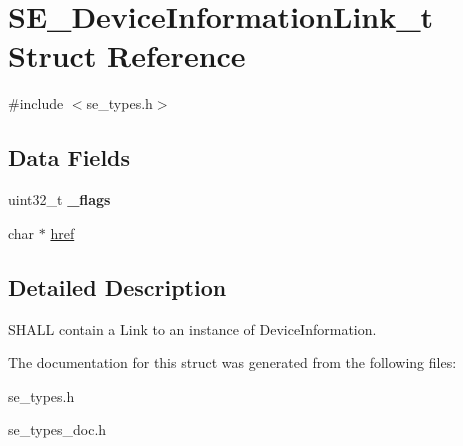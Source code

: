 \hypertarget{structSE__DeviceInformationLink__t}{}\section{S\+E\+\_\+\+Device\+Information\+Link\+\_\+t Struct Reference}
\label{structSE__DeviceInformationLink__t}


{\ttfamily \#include $<$se\+\_\+types.\+h$>$}

\subsection*{Data Fields}
\begin{DoxyCompactItemize}
\item 
uint32\+\_\+t {\bfseries \+\_\+flags}
\item 
char $\ast$ \hyperlink{group__DeviceInformationLink_ga22d97c548ebe5e890aca24545365b985}{href}
\end{DoxyCompactItemize}


\subsection{Detailed Description}
S\+H\+A\+LL contain a Link to an instance of Device\+Information. 

The documentation for this struct was generated from the following files\+:\begin{DoxyCompactItemize}
\item 
se\+\_\+types.\+h\item 
se\+\_\+types\+\_\+doc.\+h\end{DoxyCompactItemize}
